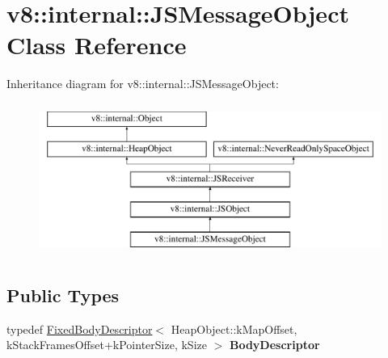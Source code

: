 \hypertarget{classv8_1_1internal_1_1JSMessageObject}{}\section{v8\+:\+:internal\+:\+:J\+S\+Message\+Object Class Reference}
\label{classv8_1_1internal_1_1JSMessageObject}
Inheritance diagram for v8\+:\+:internal\+:\+:J\+S\+Message\+Object\+:\begin{figure}[H]
\begin{center}
\leavevmode
\includegraphics[height=5.000000cm]{classv8_1_1internal_1_1JSMessageObject}
\end{center}
\end{figure}
\subsection*{Public Types}
\begin{DoxyCompactItemize}
\item 
\mbox{\label{classv8_1_1internal_1_1JSMessageObject_a3376424f5b249cefd2f910cde0bca8ba}} 
typedef \mbox{\hyperlink{classv8_1_1internal_1_1FixedBodyDescriptor}{Fixed\+Body\+Descriptor}}$<$ Heap\+Object\+::k\+Map\+Offset, k\+Stack\+Frames\+Offset+k\+Pointer\+Size, k\+Size $>$ {\bfseries Body\+Descriptor}
\end{DoxyCompactItemize}
